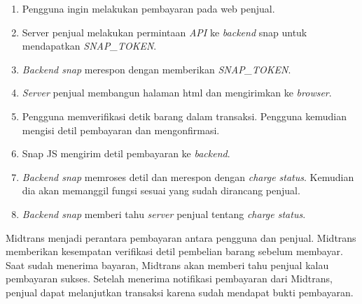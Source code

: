 \begin{enumerate}
    \item Pengguna ingin melakukan pembayaran pada web penjual.
    \item Server penjual melakukan permintaan \textit{API} ke \textit{backend} snap untuk mendapatkan \textit{SNAP\_TOKEN}.
    \item \textit{Backend snap} merespon dengan memberikan \textit{SNAP\_TOKEN}.
    \item \textit{Server} penjual membangun halaman html dan mengirimkan ke \textit{browser}.
    \item Pengguna memverifikasi detik barang dalam transaksi. Pengguna kemudian mengisi detil pembayaran dan mengonfirmasi.
    \item Snap JS mengirim detil pembayaran ke \textit{backend}.
    \item \textit{Backend snap} memroses detil dan merespon dengan \textit{charge status}. Kemudian dia akan memanggil fungsi sesuai yang sudah dirancang penjual.
    \item \textit{Backend snap} memberi tahu \textit{server} penjual tentang \textit{charge status}.
\end{enumerate}

Midtrans menjadi perantara pembayaran antara pengguna dan penjual. Midtrans memberikan kesempatan verifikasi detil pembelian barang sebelum membayar. Saat sudah menerima bayaran, Midtrans akan memberi tahu penjual kalau pembayaran sukses. Setelah menerima notifikasi pembayaran dari Midtrans, penjual dapat melanjutkan transaksi karena sudah mendapat bukti pembayaran. ~\cite{midtrans:19:midtrans}